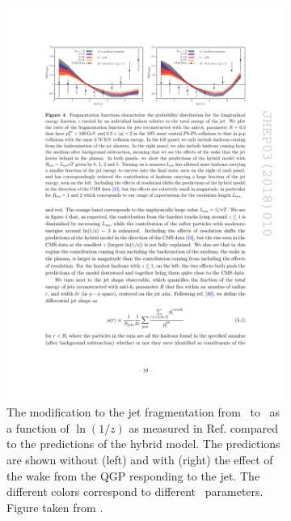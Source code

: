 \begin{figure}
\begin{subfigure}{1\textwidth}
  \centering
\includegraphics[width=1\textwidth]{figures/jetMeasurements/HM_FF}
\caption{The modification to the jet fragmentation from \pp\ to \pbpb\ as a function of $\ln(1/z)$ as measured in Ref. \cite{Chatrchyan:2014ava} compared to the predictions of the hybrid model. The predictions are shown without (left) and with (right) the effect of the wake from the QGP responding to the jet. The different colors correspond to different \Lres\ parameters. Figure taken from \cite{Hulcher:2017cpt}. }
\label{fig:hm_ff}
\end{subfigure} \\ \\ \\
\begin{subfigure}{1\textwidth}
  \centering

\end{subfigure}
\end{figure}
